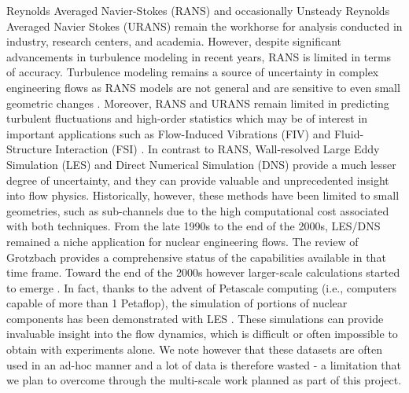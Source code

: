 Reynolds Averaged Navier-Stokes (RANS) \cite{conner2010cfd} and occasionally Unsteady Reynolds Averaged Navier Stokes (URANS) remain the workhorse for analysis conducted in industry, research centers, and academia.  However, despite significant advancements in turbulence modeling in recent years, RANS is limited in terms of accuracy. Turbulence modeling remains a source of uncertainty in complex engineering flows as RANS models are not general and are sensitive to even small geometric changes \cite{merzari2010numerical}. Moreover, RANS and URANS remain limited in predicting turbulent fluctuations and high-order statistics which may be of interest in important applications such as Flow-Induced Vibrations (FIV) and Fluid-Structure Interaction (FSI) \cite{yuan2017flow}. In contrast to RANS, Wall-resolved Large Eddy Simulation (LES) and Direct Numerical Simulation (DNS) provide a much lesser degree of uncertainty, and they can provide valuable and unprecedented insight into flow physics. Historically, however, these methods have been limited to small geometries, such as sub-channels \cite{grotzbach1999direct} due to the high computational cost associated with both techniques. From the late 1990s to the end of the 2000s, LES/DNS remained a niche application for nuclear engineering flows. The review of Grotzbach \cite{grotzbach1999direct} provides a comprehensive status of the capabilities available in that time frame. Toward the end of the 2000s however larger-scale calculations started to emerge \cite{pointer2009simulations}. In fact, thanks to the advent of Petascale computing (i.e., computers capable of more than 1 Petaflop), the simulation of portions of nuclear components has been demonstrated with LES \cite{merzari2017large}.  These simulations can provide invaluable insight into the flow dynamics, which is difficult or often impossible to obtain with experiments alone. We note however that these datasets are often used in an ad-hoc manner and a lot of data is therefore wasted - a limitation that we plan to overcome through the multi-scale work planned as part of this project.


